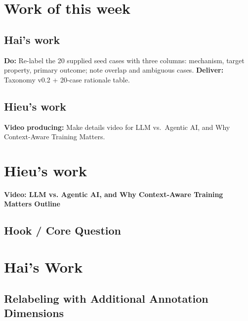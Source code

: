 \documentclass[a4paper,12pt]{report}
\begin{document}
\newpage
\chapter{Work of this week}
\section{Hai's work}
\textbf{Do:} Re-label the 20 supplied seed cases with three columns: mechanism, target property, primary outcome; note overlap and ambiguous cases.
\textbf{Deliver:} Taxonomy v0.2 + 20-case rationale table.
\section{Hieu's work}
\textbf{Video producing:} Make details video for LLM vs.\ Agentic AI, and Why Context-Aware Training Matters.

\chapter{Hieu's work}

\textbf{Video: LLM vs. Agentic AI, and Why Context-Aware Training Matters Outline}

\section{Hook / Core Question}



\chapter{Hai's Work}
\section{Relabeling with Additional Annotation Dimensions}
\end{document}
